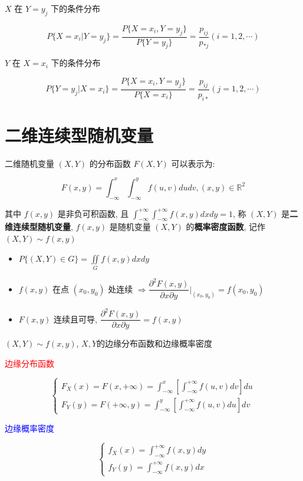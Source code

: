 \begin{definition}[条件分布]
	$X$ 在 $Y = y_{j}$ 下的条件分布 
	
	$$P\{X = x_{i}\big|Y = y_{j}\} = \dfrac{P\{X = x_{i}, Y = y_{j}\}}{P\{Y = y_{j}\}} = \dfrac{p_{ij}}{p_{*j}} (i = 1,2,\cdots)$$
	
	$Y$ 在 $X = x_{i}$ 下的条件分布
	
	$$P\{Y = y_{j}\big|X = x_{i}\} = \dfrac{P\{X = x_{i}, Y = y_{j}\}}{P\{X = x_{i}\}} = \dfrac{p_{ij}}{p_{i*}} (j = 1,2,\cdots)$$	
\end{definition}


\section{二维连续型随机变量}

\begin{definition}[分布函数和概率密度]
	二维随机变量 $(X,Y)$ 的分布函数 $F(X,Y)$ 可以表示为:

	$$F(x,y) = \int_{-\infty}^{x}\int_{-\infty}^{y}f(u,v)dudv, (x,y)\in\mathbb{R}^2$$
	
	其中 $f(x,y)$ 是非负可积函数, 且 $\int_{-\infty}^{+\infty}\int_{-\infty}^{+\infty}f(x,y)dxdy = 1$, 称 $(X,Y)$ 是\textbf{二维连续型随机变量}, 
	$f(x,y)$ 是随机变量 $(X,Y)$ 的\textbf{概率密度函数}, 记作 $(X,Y)\sim f(x,y)$
\end{definition}

\begin{corollary}[分布函数和概率密度性质]
	\begin{itemize}
		\item $P\{(X,Y)\in G\} = \iint\limits_{G}f(x,y)dxdy$
		\item $f(x,y)$ 在点 $(x_{0},y_{0})$ 处连续 $\Rightarrow \dfrac{\partial^2 F(x,y)}{\partial x\partial y}\big|_{(x_{0},y_{0})} = f(x_{0},y_{0})$
		\item $F(x,y)$ 连续且可导, $\dfrac{\partial^{2} F(x,y)}{\partial x\partial y} = f(x,y)$
	\end{itemize}
\end{corollary}

\begin{definition}[边缘分布函数和边缘概率密度]
	
	$(X,Y)\sim f(x,y)$, $X,Y$的边缘分布函数和边缘概率密度 
	
	\textcolor{red}{边缘分布函数}
	
	$$\begin{cases}
		F_{X}(x) = F(x,+\infty) = \int_{-\infty}^{x}\left[ \int_{-\infty}^{+\infty}f(u,v)dv\right] du\\
		F_{Y}(y) = F(+\infty,y) = \int_{-\infty}^{y}\left[ \int_{-\infty}^{+\infty}f(u,v)du\right] dv
	\end{cases}$$
	
	\textcolor{blue}{边缘概率密度}
	
	$$\begin{cases}
		f_{X}(x) = \int_{-\infty}^{+\infty}f(x,y)dy\\
		f_{Y}(y) = \int_{-\infty}^{+\infty}f(x,y)dx
	\end{cases}$$
\end{definition}

